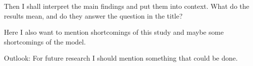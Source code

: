 Then I shall interpret the main findings and put them into context. What do the results mean, and do they answer the question in the title? 

Here I also want to mention shortcomings of this study and maybe some shortcomings of the model.


Outlook: For future research I should mention something that could be done.



